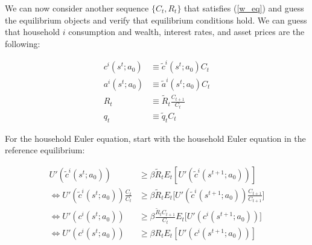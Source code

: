 \documentclass{article}
\begin{document}
\begin{enumerate}
We can now consider another sequence $\{C_t, R_t\}$ that satisfies (\ref{w_eq}) and guess the equilibrium objects and verify that equilibrium conditions hold. We can guess that household $i$ consumption and wealth, interest rates, and asset prices are the following:

\begin{align*}
c^i(s^t; a_0) &\equiv \tilde c^i(s^t; a_0) C_t\\
a^i(s^t; a_0) &\equiv \tilde a^i(s^t; a_0) C_t\\
R_t &\equiv \tilde R_t \frac{C_{t+1}}{C_t}\\
q_t &\equiv \tilde q_t C_t
\end{align*}

For the household Euler equation, start with the household Euler equation in the reference equilibrium:

\begin{align*}
U'(\tilde c^i(s^t; a_0)) &\ge \beta \tilde R_t E_t[U'(\tilde c^i(s^{t+1}; a_0))]\\
\iff
U'(\tilde c^i(s^t; a_0))\frac{C_t}{C_t} &\ge \beta \tilde R_t E_t\Bigg[U'(\tilde c^i(s^{t+1}; a_0))\frac{C_{t+1}}{C_{t+1}}\Bigg]\\
\iff
U'( c^i(s^t; a_0)) &\ge \beta \frac{\tilde R_t C_{t+1}}{C_t} E_t\Bigg[U'( c^i(s^{t+1}; a_0))\Bigg]\\
\iff
U'( c^i(s^t; a_0)) &\ge \beta  R_t E_t [U'( c^i(s^{t+1}; a_0))]
\end{align*}


\end{enumerate}
\end{document}
